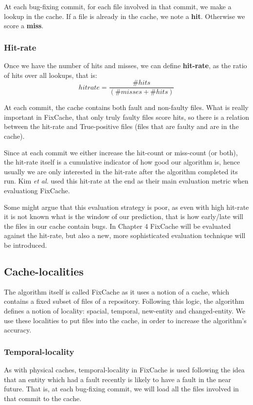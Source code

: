 \documentclass[12pt,twoside,notitlepage]{report}
\newcommand{\fxch}{FixCache}
\newcommand{\etal}{\textit{et al.}}
\begin{document}
At each bug-fixing commit, for each file involved in that commit, we make a lookup in the cache. If a file is already in the cache, we note a \textbf{hit}. Otherwise we score a \textbf{miss}.
\subsubsection*{Hit-rate}
Once we have the number of hits and misses, we can define \textbf{hit-rate}, as the ratio of hits over all lookups, that is:
\[
	hitrate = \frac{\#hits}{(\#misses + \#hits)}
\]

At each commit, the cache contains both fault and non-faulty files. What is really important in \fxch{}, that only truly faulty files score hits, so there is a relation between the hit-rate and True-positive files (files that are faulty and are in the cache).

Since at each commit we either increase the hit-count or miss-count (or both), the hit-rate itself is a cumulative indicator of how good our algorithm is, hence usually we are only interested in the hit-rate after the algorithm completed its run. Kim \etal{}\cite{FixCache} used this hit-rate at the end as their main evaluation metric when evaluationg \fxch{}.

Some might argue that this evaluation strategy is poor, as even with high hit-rate it is not known what is the window of our prediction, that is how early/late will the files in our cache contain bugs. In Chapter 4 \fxch{} will be evaluated against the hit-rate, but also a new, more sophisticated evaluation technique will be introduced.
\subsection{Cache-localities}
The algorithm itself is called \fxch{} as it uses a notion of a cache, which contains a fixed subset of files of a repository. Following this logic, the algorithm defines a notion of locality: spacial, temporal, new-entity and changed-entity. We use these localities to put files into the cache, in order to increase the algorithm's accuracy.
\subsubsection{Temporal-locality}
As with physical caches, temporal-locality in \fxch{} is used following the idea that an entity which had a fault recently is likely to have a fault in the near future. That is, at each bug-fixing commit, we will load all the files involved in that commit to the cache.
\end{document}
